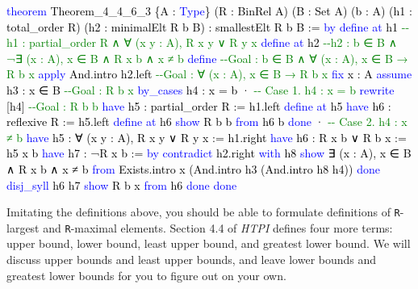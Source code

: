 \documentclass[
  letterpaper,
  DIV=11,
  numbers=noendperiod]{scrreprt}
\newenvironment{Shaded}{\begin{snugshade}}{\end{snugshade}}
\newcommand{\CommentTok}[1]{\textcolor[rgb]{0.37,0.37,0.37}{#1}}
\newcommand{\KeywordTok}[1]{\textcolor[rgb]{0.00,0.23,0.31}{#1}}
\newcommand{\NormalTok}[1]{\textcolor[rgb]{0.00,0.23,0.31}{#1}}
\renewcommand{\NormalTok}[1]{\textcolor[HTML]{000000}{#1}}
\renewcommand{\KeywordTok}[1]{\textcolor[HTML]{0000FF}{#1}}
\renewcommand{\CommentTok}[1]{\textcolor[HTML]{008000}{#1}}
\theoremstyle{remark}
\begin{document}
\begin{Shaded}
\begin{Highlighting}[]
\KeywordTok{theorem}\NormalTok{ Theorem\_4\_4\_6\_3 \{A : }\KeywordTok{Type}\NormalTok{\} (R : BinRel A) (B : Set A) (b : A)}
\NormalTok{    (h1 : total\_order R) (h2 : minimalElt R b B) : smallestElt R b B := }\KeywordTok{by}
  \KeywordTok{define} \KeywordTok{at}\NormalTok{ h1         }\CommentTok{{-}{-}h1 : partial\_order R ∧ ∀ (x y : A), R x y ∨ R y x}
  \KeywordTok{define} \KeywordTok{at}\NormalTok{ h2         }\CommentTok{{-}{-}h2 : b ∈ B ∧ ¬∃ (x : A), x ∈ B ∧ R x b ∧ x ≠ b}
  \KeywordTok{define}               \CommentTok{{-}{-}Goal : b ∈ B ∧ ∀ (x : A), x ∈ B → R b x}
  \KeywordTok{apply}\NormalTok{ And.intro h2.left  }\CommentTok{{-}{-}Goal : ∀ (x : A), x ∈ B → R b x}
  \KeywordTok{fix}\NormalTok{ x : A}
  \KeywordTok{assume}\NormalTok{ h3 : x ∈ B        }\CommentTok{{-}{-}Goal : R b x}
  \KeywordTok{by\_cases}\NormalTok{ h4 : x = b}
\NormalTok{  · }\CommentTok{{-}{-} Case 1. h4 : x = b}
    \KeywordTok{rewrite}\NormalTok{ [h4]             }\CommentTok{{-}{-}Goal : R b b}
    \KeywordTok{have}\NormalTok{ h5 : partial\_order R := h1.left}
    \KeywordTok{define} \KeywordTok{at}\NormalTok{ h5}
    \KeywordTok{have}\NormalTok{ h6 : reflexive R := h5.left}
    \KeywordTok{define} \KeywordTok{at}\NormalTok{ h6}
    \KeywordTok{show}\NormalTok{ R b b }\KeywordTok{from}\NormalTok{ h6 b}
    \KeywordTok{done}
\NormalTok{  · }\CommentTok{{-}{-} Case 2. h4 : x ≠ b}
    \KeywordTok{have}\NormalTok{ h5 : ∀ (x y : A), R x y ∨ R y x := h1.right}
    \KeywordTok{have}\NormalTok{ h6 : R x b ∨ R b x := h5 x b}
    \KeywordTok{have}\NormalTok{ h7 : ¬R x b := }\KeywordTok{by}
      \KeywordTok{contradict}\NormalTok{ h2.right }\KeywordTok{with}\NormalTok{ h8}
      \KeywordTok{show}\NormalTok{ ∃ (x : A), x ∈ B ∧ R x b ∧ x ≠ b }\KeywordTok{from}
\NormalTok{        Exists.intro x (And.intro h3 (And.intro h8 h4))}
      \KeywordTok{done}
    \KeywordTok{disj\_syll}\NormalTok{ h6 h7}
    \KeywordTok{show}\NormalTok{ R b x }\KeywordTok{from}\NormalTok{ h6}
    \KeywordTok{done}
  \KeywordTok{done}
\end{Highlighting}
\end{Shaded}

Imitating the definitions above, you should be able to formulate
definitions of \texttt{R}-largest and \texttt{R}-maximal elements.
Section 4.4 of \emph{HTPI} defines four more terms: upper bound, lower
bound, least upper bound, and greatest lower bound. We will discuss
upper bounds and least upper bounds, and leave lower bounds and greatest
lower bounds for you to figure out on your own.
\end{document}
